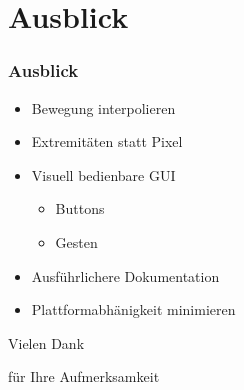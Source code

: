 \documentclass[compress]{beamer}
\begin{document}
\section{Ausblick}

\begin{frame}
\frametitle{Ausblick}
\begin{itemize}
	\item Bewegung interpolieren
	\item Extremitäten statt Pixel
	\item Visuell bedienbare GUI
	\begin{itemize}
		\item Buttons
		\item Gesten
	\end{itemize}
	\item Ausführlichere Dokumentation
	\item Plattformabhänigkeit minimieren
\end{itemize}
\end{frame}

\begin{frame}
\Huge
\centerline{Vielen Dank}
\centerline{für Ihre Aufmerksamkeit}
\end{frame}
\end{document}
